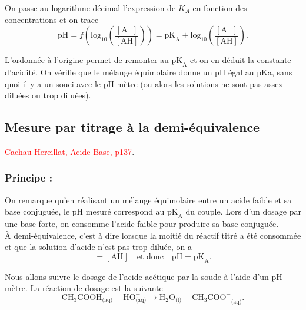 \documentclass[11pt,a4paper]{report}
\begin{document}
On passe au logarithme décimal l'expression de $K_A$ en fonction des concentrations et on trace 
\begin{equation}
	\text{pH} = f\left(\text{log}_{10}\left(\frac{[\text{A}^-]}{[\text{AH}]}\right)\right)
	= \text{pK}_\text{A} + \text{log}_{10}\left(\frac{[\text{A}^-]}{[\text{AH}]}\right).
\end{equation}

L'ordonnée à l'origine permet de remonter au $\text{pK}_\text{A}$ et on en déduit la constante d'acidité. On vérifie que le mélange équimolaire donne un pH égal au pKa, sans quoi il y a un souci avec le pH-mètre (ou alors les solutions ne sont pas assez diluées ou trop diluées).

\subsection{Mesure par titrage à la demi-équivalence}
\textcolor{red}{Cachau-Hereillat, Acide-Base, p137}.

\subsubsection{Principe :}
On remarque qu'en réalisant un mélange équimolaire entre un acide faible et sa base conjuguée, le pH mesuré correspond au $\text{pK}_\text{A}$ du couple. Lors d'un dosage par une base forte, on consomme l'acide faible pour produire sa base conjuguée.\\

\`A demi-équivalence, c'est à dire lorsque la moitié du réactif titré a été consommée et que la solution d'acide n'est pas trop diluée, on a
\begin{equation}
	[\text{A}^-] = [\text{AH}] \quad\text{et donc}\quad \text{pH} = \text{pK}_\text{A}.
\end{equation} 

Nous allons suivre le dosage de l'acide acétique par la soude à l'aide d'un pH-mètre. La réaction de dosage est la suivante
\begin{equation}
	\boxed{\text{CH}_3\text{COOH}_\text{(aq)} + \text{HO}^-_\text{(aq)} 
	\longrightarrow \text{H}_2\text{O}_\text{(l)} + {\text{CH}_3\text{COO}^-}_\text{(aq)}}.
\end{equation}
\end{document}
